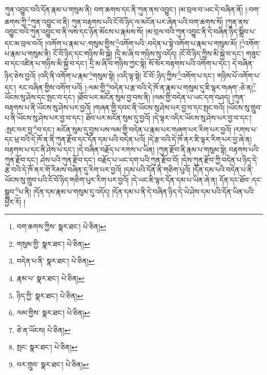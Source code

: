 ཀུན་འབྱུང་བའི་དོན་རྣམ་པ་གསུམ་ནི། བག་ཆགས་དང་ནི་ཀུན་ནས་འབྱུང་། །མ་བྲལ་བ་ཡང་དེ་བཞིན་ནོ། །:བག་ཆགས་ཀྱི་\footnote{བག་ཆགས་ཀྱིས་  སྣར་ཐང་།  པེ་ཅིན། }ཀུན་འབྱུང་བ་ནི། ཀུན་བརྟགས་པའི་ངོ་བོ་ཉིད་ལ་མངོན་པར་ཞེན་པའི་བག་ཆགས་སོ། །ཀུན་ནས་འབྱུང་བའི་ཀུན་འབྱུང་བ་ནི་ལས་དང་ཉོན་མོངས་པ་རྣམས་སོ། །མ་བྲལ་བའི་ཀུན་འབྱུང་ནི་དེ་བཞིན་ཉིད་སྒྲིབ་པ་དང་མ་བྲལ་བའོ། །འགོག་པ་རྣམ་པ་:གསུམ་གྱིས་\footnote{གསུམ་གྱི་  སྣར་ཐང་།  པེ་ཅིན། }འགོག་པའི་:བདེན་པ་སྟེ་འགོག་པ་རྣམ་པ་གསུམ་མོ། །\footnote{བདེན་པ་ནི་  སྣར་ཐང་།  པེ་ཅིན། }འགོག་པ་རྣམ་པ་གསུམ་ནི། ངོ་བོ་ཉིད་དང་གཉིས་མི་སྐྱེ། །དྲི་མ་ཞི་བ་གཉིས་སུ་འདོད། །ངོ་བོ་ཉིད་ཀྱིས་མི་སྐྱེ་བ་དང་། གཟུང་བ་དང་འཛིན་པ་གཉིས་མི་སྐྱེ་བ་དང་། དྲི་མ་ཞི་བ་གཉིས་ཀྱང་སྟེ། སོ་སོར་བརྟགས་པའི་འགོག་པ་དང་། དེ་བཞིན་ཉིད་ཅེས་བྱའོ། །འདི་ནི་འགོག་པ་རྣམ་\footnote{རྣམ་པ་  སྣར་ཐང་།  པེ་ཅིན། }གསུམ་སྟེ། །འདི་ལྟ་སྟེ། ངོ་བོ་:ཉིད་ཀྱིས་\footnote{ཉིད་ཀྱི་  སྣར་ཐང་།  པེ་ཅིན། }འགོག་པ་དང་། གཉིས་པོ་འགོག་པ་དང་། རང་བཞིན་གྱིས་འགོག་པའོ། །:ལམ་གྱི་\footnote{ལམ་གྱིས་  སྣར་ཐང་།  པེ་ཅིན། }བདེན་པ་རྩ་བའི་དེ་ཁོ་ན་རྣམ་པ་གསུམ་དུ་ཇི་ལྟར་གཞག་:ཅེ་ན།\footnote{ཅེ་ན་ཡོངས།  པེ་ཅིན། } ཡོངས་སུ་ཤེས་དང་སྤང་བ་དང་། །ཐོབ་པར་མངོན་སུམ་བྱ་བས་ནི། །ལམ་གྱི་བདེན་པ་ཡང་དག་བཤད། །ཀུན་བརྟགས་པ་ནི་ཡོངས་སུ་ཤེས་པར་བྱའོ། །གཞན་གྱི་དབང་ནི་ཡོངས་སུ་ཤེས་པར་བྱ་བ་དང་སྤང་བའོ། །ཡོངས་སུ་གྲུབ་པ་ནི་ཡོངས་སུ་ཤེས་པར་བྱ་བ་དང་། ཐོབ་པར་མངོན་སུམ་དུ་བྱའོ། །དེ་ལྟར་འདིར་ཡོངས་སུ་ཤེས་པར་བྱ་བ་དང་། :སྤང་བར་བྱ་\footnote{སྤང་  སྣར་ཐང་།  པེ་ཅིན། }བ་དང་། མངོན་སུམ་དུ་བྱས་པས་ལམ་གྱི་བདེན་པ་རྣམ་པར་གཞག་པར་རིག་པར་བྱའོ། །རགས་པ་དང་ཕྲ་བའི་དེ་ཁོ་ན་ནི་ཀུན་རྫོབ་དང་དོན་དམ་པའི་བདེན་པའོ། །དེ་རྩ་བའི་དེ་ཁོ་ནར་ཇི་ལྟར་རིག་པར་བྱ་ཞེ་ན། བརྟགས་པ་དང་ནི་ཤེས་པ་དང་། །དེ་བཞིན་བརྗོད་པ་རགས་པ་ཡིན། །ཀུན་རྫོབ་ནི་རྣམ་པ་གསུམ་སྟེ། བརྟགས་པའི་ཀུན་རྫོབ་དང་། ཤེས་པའི་ཀུན་རྫོབ་དང་། བརྗོད་པ་ཡང་དག་པའི་ཀུན་རྫོབ་བོ། །དེས་ཀུན་རྫོབ་ཀྱི་བདེན་པ་ཉིད་དེ་རྩ་བའི་དེ་ཁོ་ནར་གོ་རིམས་བཞིན་དུ་རིག་པར་བྱའོ། །དམ་པའི་དོན་ནི་གཅིག་པུའོ། །དོན་དམ་པའི་བདེན་པ་ནི་ཡོངས་སུ་གྲུབ་པའི་ངོ་བོ་ཉིད་གཅིག་པུར་རིག་པར་བྱའོ། །དེ་ཡང་ཇི་ལྟར་དོན་དམ་པ་ཡིན་ཞེ་ན། དོན་དང་ཐོབ་:དང་སྒྲུབ་\footnote{བར་གྲུབ་  སྣར་ཐང་།  པེ་ཅིན། }པ་ནི། །དོན་དམ་རྣམ་པ་གསུམ་དུ་འདོད། །དོན་དམ་པ་ནི་དེ་བཞིན་ཉིད་དེ་ཡེ་ཤེས་དམ་པའི་དོན་ཡིན་པའི་ཕྱིར་རོ། །
